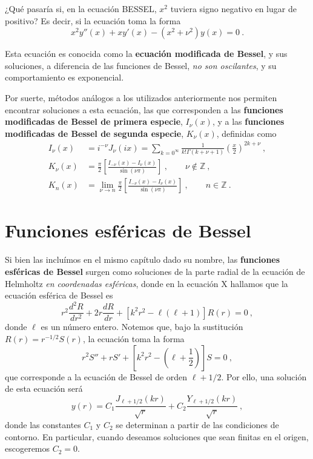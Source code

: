 ¿Qué pasaría si, en la ecuación BESSEL, $x^2$ tuviera signo negativo en lugar de positivo? Es decir, si la ecuación toma la forma
\begin{equation}
    x^2 y''(x) + x y'(x) - (x^2 + \nu^2)y(x) = 0 \ . 
\end{equation}

Esta ecuación es conocida como la \textbf{ecuación modificada de Bessel}, y sus soluciones, a diferencia de las funciones de Bessel, \emph{no son oscilantes}, y su comportamiento es exponencial.

Por suerte, métodos análogos a los utilizados anteriormente nos permiten encontrar soluciones a esta ecuación, las que corresponden a las \textbf{funciones modificadas de Bessel de primera especie}, $I_\nu(x)$, y a las \textbf{funciones modificadas de Bessel de segunda especie}, $K_\nu(x)$, definidas como
\begin{align}
    I_\nu(x) & = i^{-\nu} J_\nu(ix) = \sum_{k=0^\infty} \frac{1}{k! \Gamma(k+\nu+1)} \left( \frac{x}{2} \right)^{2k+\nu} \ , \\
    K_\nu(x) & = \frac{\pi}{2} \left[ \frac{I_{-\nu}(x) - I_\nu(x)}{\sin(\nu \pi)} \right] \ , \qquad \nu \notin \mathbb{Z} \ , \\
    K_n(x) & = \lim_{\nu \to n} \frac{\pi}{2} \left[ \frac{I_{-\nu}(x) - I_\nu(x)}{\sin(\nu \pi)} \right] \ , \qquad n \in \mathbb{Z} \ .
\end{align}

\section{Funciones esféricas de Bessel}

Si bien las incluímos en el mismo capítulo dado su nombre, las \textbf{funciones esféricas de Bessel} surgen como soluciones de la parte radial de la ecuación de Helmholtz \emph{en coordenadas esféricas}, donde en la ecuación X hallamos que la ecuación esférica de Bessel es
\begin{equation}
    r^2 \frac{d^2R}{dr^2} + 2r \frac{dR}{dr} + [k^2 r^2 - \ell (\ell+1)]R(r) = 0 \ ,
\end{equation}
donde $\ell$ es un número entero. Notemos que, bajo la sustitución $R(r) = r^{-1/2} S(r)$, la ecuación toma la forma
\begin{equation}
    r^2 S'' + rS' + \left[k^2r^2 - \left(\ell + \frac{1}{2}\right)\right]S = 0 \ ,
\end{equation}
que corresponde a la ecuación de Bessel de orden $\ell + 1/2$. Por ello, una solución de esta ecuación será
\begin{equation}
    y(r) = C_1 \frac{J_{\ell + 1/2}(kr)}{\sqrt{r}} + C_2 \frac{Y_{\ell + 1/2}(kr)}{\sqrt{r}} \ ,
\end{equation}
donde las constantes $C_1$ y $C_2$ se determinan a partir de las condiciones de contorno. En particular, cuando deseamos soluciones que sean finitas en el origen, escogeremos $C_2 = 0$.

